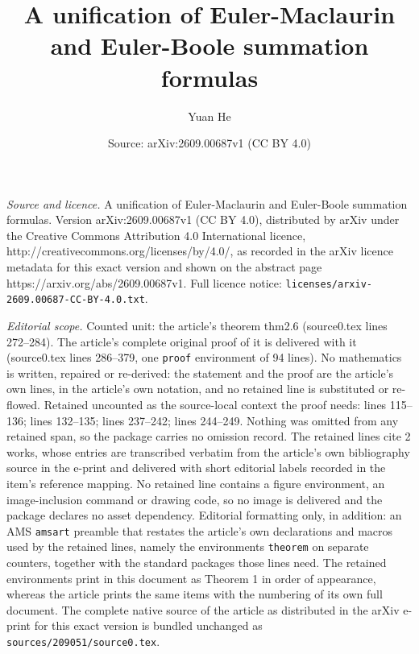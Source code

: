 \documentclass[10pt,a4paper]{amsart}
\title{A unification of Euler-Maclaurin and Euler-Boole summation formulas}
\author{Yuan He}
\date{Source: arXiv:2609.00687v1 (CC BY 4.0)}
\begin{document}
\maketitle

\noindent\emph{Source and licence.} A unification of Euler-Maclaurin and Euler-Boole summation formulas. Version arXiv:2609.00687v1 (CC BY 4.0), distributed by arXiv under the Creative Commons Attribution 4.0 International licence, http://creativecommons.org/licenses/by/4.0/, as recorded in the arXiv licence metadata for this exact version and shown on the abstract page https://arxiv.org/abs/2609.00687v1. Full licence notice: \texttt{licenses/arxiv-2609.00687-CC-BY-4.0.txt}.\par\smallskip

\noindent\textit{Editorial scope.} Counted unit: the article's theorem thm2.6 (source0.tex lines 272--284). The article's complete original proof of it is delivered with it (source0.tex lines 286--379, one \texttt{proof} environment of 94 lines). No mathematics is written, repaired or re-derived: the statement and the proof are the article's own lines, in the article's own notation, and no retained line is substituted or re-flowed.  Retained uncounted as the source-local context the proof needs: lines 115--136; lines 132--135; lines 237--242; lines 244--249.  Nothing was omitted from any retained span, so the package carries no omission record.  The retained lines cite 2 works, whose entries are transcribed verbatim from the article's own bibliography source in the e-print and delivered with short editorial labels recorded in the item's reference mapping.  No retained line contains a figure environment, an image-inclusion command or drawing code, so no image is delivered and the package declares no asset dependency.  Editorial formatting only, in addition: an AMS \texttt{amsart} preamble that restates the article's own declarations and macros used by the retained lines, namely the environments \texttt{theorem} on separate counters, together with the standard packages those lines need.  The retained environments print in this document as Theorem 1 in order of appearance, whereas the article prints the same items with the numbering of its own full document.  The complete native source of the article as distributed in the arXiv e-print for this exact version is bundled unchanged as \texttt{sources/209051/source0.tex}.
\end{document}
